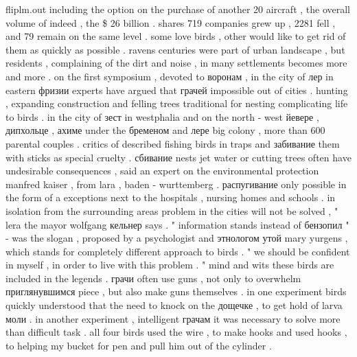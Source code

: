 fliplm.out 
including the option on the purchase of another 20 aircraft , the overall volume of indeed , the \$ 26 billion .
shares 719 companies grew up , 2281 fell , and 79 remain on the same level .
some love birds , other would like to get rid of them as quickly as possible . ravens centuries were part of urban landscape , but residents , complaining of the dirt and noise , in many settlements becomes more and more .
on the first symposium , devoted to воронам , in the city of лер in eastern фризии experts have argued that грачей impossible out of cities .
hunting , expanding construction and felling trees traditional for nesting complicating life to birds .
in the city of зест in westphalia and on the north - west йевере , дипхольце , ахиме under the бременом and лере big colony , more than 600 parental couples .
critics of described fishing birds in traps and забивание them with sticks as special cruelty .
сбивание nests jet water or cutting trees often have undesirable consequences , said an expert on the environmental protection manfred kaiser , from lara , baden - wurttemberg .
распугивание only possible in the form of a exceptions next to the hospitals , nursing homes and schools .
in isolation from the surrounding areas problem in the cities will not be solved , " lera the mayor wolfgang кельнер says .
" information stands instead of бензопил " - was the slogan , proposed by a psychologist and этнологом утой mary yurgens , which stands for completely different approach to birds . " we should be confident in myself , in order to live with this problem . "
mind and wits these birds are included in the legends . грачи often use guns , not only to overwhelm приглянувшимся piece , but also make guns themselves .
in one experiment birds quickly understood that the need to knock on the дощечке , to get hold of larva моли .
in another experiment , intelligent грачам it was necessary to solve more than difficult task .
all four birds used the wire , to make hooks and used hooks , to helping my bucket for pen and pull him out of the cylinder .